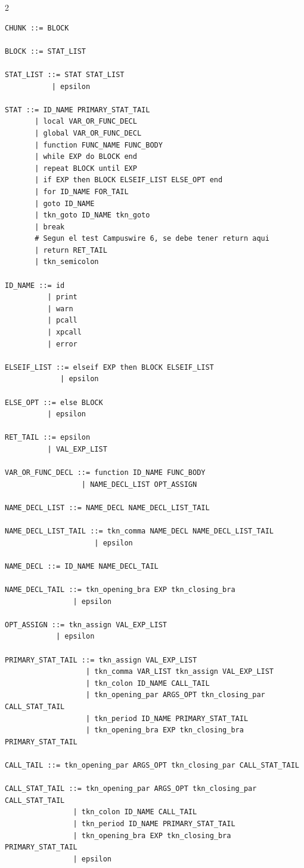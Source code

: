 \documentclass[10pt,letterpaper]{article}
\begin{document}
\begin{multicols}{2}
\begin{lstlisting}[style=grammarstyle]
CHUNK ::= BLOCK

BLOCK ::= STAT_LIST

STAT_LIST ::= STAT STAT_LIST
           | epsilon

STAT ::= ID_NAME PRIMARY_STAT_TAIL
       | local VAR_OR_FUNC_DECL
       | global VAR_OR_FUNC_DECL
       | function FUNC_NAME FUNC_BODY
       | while EXP do BLOCK end
       | repeat BLOCK until EXP
       | if EXP then BLOCK ELSEIF_LIST ELSE_OPT end
       | for ID_NAME FOR_TAIL
       | goto ID_NAME
       | tkn_goto ID_NAME tkn_goto
       | break
       # Segun el test Campuswire 6, se debe tener return aqui
       | return RET_TAIL
       | tkn_semicolon

ID_NAME ::= id
          | print
          | warn
          | pcall
          | xpcall
          | error

ELSEIF_LIST ::= elseif EXP then BLOCK ELSEIF_LIST
             | epsilon

ELSE_OPT ::= else BLOCK
          | epsilon

RET_TAIL ::= epsilon
          | VAL_EXP_LIST

VAR_OR_FUNC_DECL ::= function ID_NAME FUNC_BODY
                  | NAME_DECL_LIST OPT_ASSIGN

NAME_DECL_LIST ::= NAME_DECL NAME_DECL_LIST_TAIL

NAME_DECL_LIST_TAIL ::= tkn_comma NAME_DECL NAME_DECL_LIST_TAIL
                     | epsilon

NAME_DECL ::= ID_NAME NAME_DECL_TAIL

NAME_DECL_TAIL ::= tkn_opening_bra EXP tkn_closing_bra
                | epsilon

OPT_ASSIGN ::= tkn_assign VAL_EXP_LIST
            | epsilon

PRIMARY_STAT_TAIL ::= tkn_assign VAL_EXP_LIST
                   | tkn_comma VAR_LIST tkn_assign VAL_EXP_LIST
                   | tkn_colon ID_NAME CALL_TAIL
                   | tkn_opening_par ARGS_OPT tkn_closing_par CALL_STAT_TAIL
                   | tkn_period ID_NAME PRIMARY_STAT_TAIL
                   | tkn_opening_bra EXP tkn_closing_bra PRIMARY_STAT_TAIL

CALL_TAIL ::= tkn_opening_par ARGS_OPT tkn_closing_par CALL_STAT_TAIL

CALL_STAT_TAIL ::= tkn_opening_par ARGS_OPT tkn_closing_par CALL_STAT_TAIL
                | tkn_colon ID_NAME CALL_TAIL
                | tkn_period ID_NAME PRIMARY_STAT_TAIL
                | tkn_opening_bra EXP tkn_closing_bra PRIMARY_STAT_TAIL
                | epsilon


\end{lstlisting}
\end{multicols}
\end{document}
